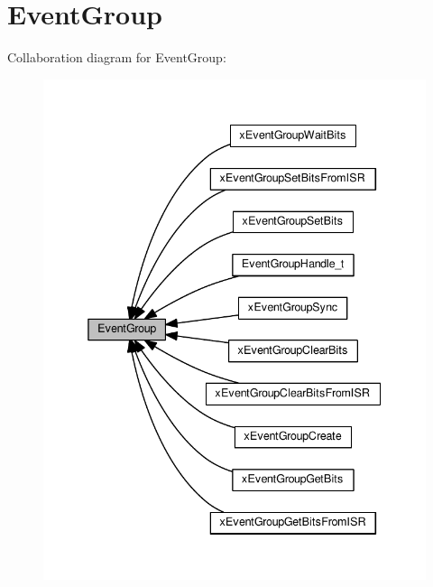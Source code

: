 \hypertarget{group___event_group}{}\section{Event\+Group}
\label{group___event_group}
Collaboration diagram for Event\+Group\+:\nopagebreak
\begin{figure}[H]
\begin{center}
\leavevmode
\includegraphics[width=338pt]{group___event_group}
\end{center}
\end{figure}

